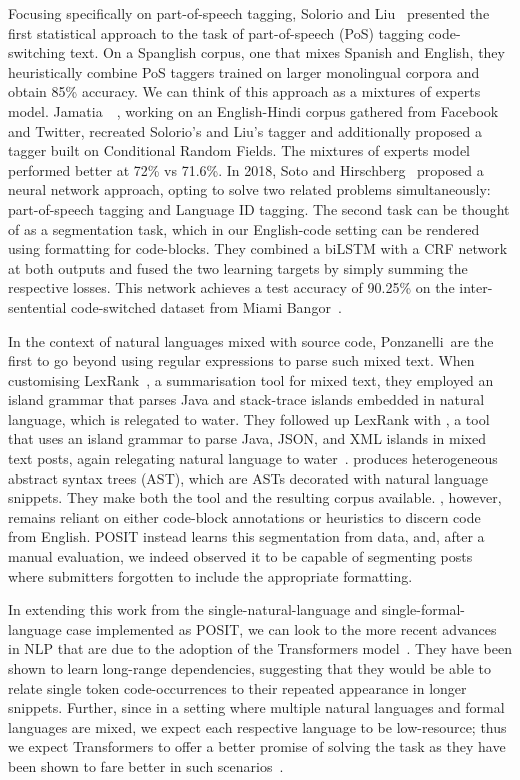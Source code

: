 Focusing specifically on part-of-speech tagging, Solorio and
Liu~\cite{Solorio2008} presented the first statistical approach to the task of
part-of-speech (PoS) tagging code-switching text. On a Spanglish corpus, one
that mixes Spanish and English, they heuristically combine PoS taggers trained
on larger monolingual corpora and obtain 85\% accuracy. We can think of this
approach as a mixtures of experts model. Jamatia~\etal~\cite{Jamatia2015},
working on an English-Hindi corpus gathered from Facebook and Twitter, recreated
Solorio's and Liu's tagger and additionally proposed a tagger built on
Conditional Random Fields. The mixtures of experts model performed better at
72\% vs 71.6\%. In 2018, Soto and Hirschberg~\cite{Soto2018} proposed a neural
network approach, opting to solve two related problems simultaneously:
part-of-speech tagging and Language ID tagging. The second task can be thought
of as a segmentation task, which in our English-code setting can be rendered
using formatting for code-blocks. They combined a biLSTM with a CRF network at
both outputs and fused the two learning targets by simply summing the respective
losses. This network achieves a test accuracy of 90.25\% on the inter-sentential
code-switched dataset from Miami Bangor~\cite{bangorTalk}.

In the context of natural languages mixed with source code, Ponzanelli~\etal are
the first to go beyond using regular expressions to parse such mixed text. When
customising LexRank~\cite{Ponzanelli2015b}, a summarisation tool for mixed text,
they employed an island grammar that parses Java and stack-trace islands
embedded in natural language, which is relegated to water. They followed up
LexRank with \stormed, a tool that uses an island grammar to parse Java, JSON,
and XML islands in mixed text \SO posts, again relegating natural language to
water~\cite{Ponzanelli2015a}.  \stormed produces heterogeneous abstract syntax
trees (AST), which are ASTs decorated with natural language snippets. They make
both the tool and the resulting corpus available. \stormed, however, remains
reliant on either code-block annotations or heuristics to discern code from
English. POSIT instead learns this segmentation from data, and, after a manual
evaluation, we indeed observed it to be capable of segmenting \SO posts where
submitters forgotten to include the appropriate formatting.

In extending this work from the single-natural-language and
single-formal-language case implemented as POSIT, we can look to the more recent
advances in NLP that are due to the adoption of the Transformers
model~\cite{vaswani2017attention, wang2019language}. They have been shown to
learn long-range dependencies, suggesting that they would be able to relate
single token code-occurrences to their repeated appearance in longer snippets.
Further, since in a setting where multiple natural languages and formal
languages are mixed, we expect each respective language to be low-resource; thus
we expect Transformers to offer a better promise of solving the task as they
have been shown to fare better in such scenarios~\cite{lakew2017multilingual}.

